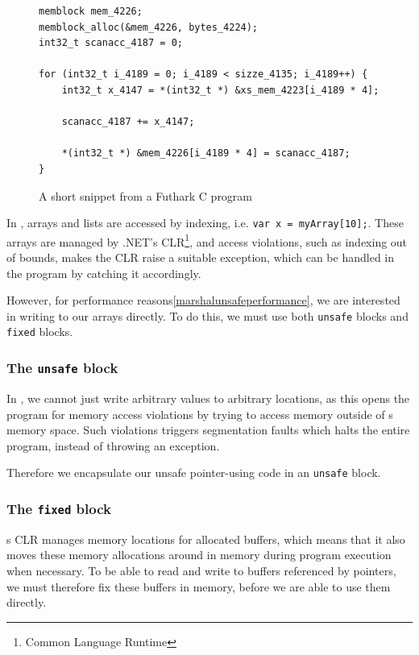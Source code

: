 \begin{description}
\begin{figure}
\centering
\begin{verbatim}
memblock mem_4226;
memblock_alloc(&mem_4226, bytes_4224);
int32_t scanacc_4187 = 0;

for (int32_t i_4189 = 0; i_4189 < sizze_4135; i_4189++) {
    int32_t x_4147 = *(int32_t *) &xs_mem_4223[i_4189 * 4];
    
    scanacc_4187 += x_4147;

    *(int32_t *) &mem_4226[i_4189 * 4] = scanacc_4187;
}
\end{verbatim}
\caption{A short snippet from a Futhark C program}
\label{fig:futharkcscene}
\end{figure} 

In \csharp{}, arrays and lists are accessed by indexing, i.e. \texttt{var
  x = myArray[10];}.
These arrays are managed by .NET's CLR\footnote{Common Language Runtime}, and
access violations, such as indexing out of bounds, makes the CLR raise a suitable
exception, which can be handled in the \csharp{} program by catching it
accordingly.

However, for performance reasons\ref{marshalunsafeperformance}, we are interested in writing to our \csharp{}
arrays directly.
To do this, we must use both \texttt{unsafe} blocks and \texttt{fixed} blocks.

\subsubsection{The \texttt{unsafe} block}
In \csharp{}, we cannot just write arbitrary values to arbitrary locations, as this
opens the program for memory access violations by trying to access memory
outside of \csharp{}s memory space. Such violations triggers segmentation faults
which halts the entire program, instead of throwing an exception.

Therefore we encapsulate our unsafe pointer-using code in an \texttt{unsafe}
block.

\subsubsection{The \texttt{fixed} block}
\csharp{}s CLR manages memory locations for allocated buffers, which means that
it also moves these memory allocations around in memory during program execution
when necessary.
To be able to read and write to buffers referenced by pointers, we must
therefore fix these buffers in memory, before we are able to use them directly.


\end{description}
